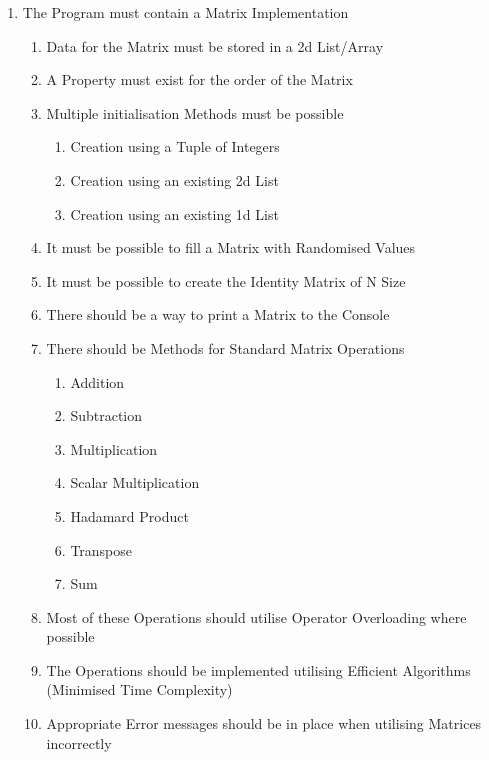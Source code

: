 \begin{flushleft}
\begin{enumerate}
                \item The Program must contain a Matrix Implementation
                \begin{enumerate}
                    \item Data for the Matrix must be stored in a 2d List/Array
                    \item A Property must exist for the order of the Matrix
                    \item Multiple initialisation Methods must be possible
                    \begin{enumerate}
                        \item Creation using a Tuple of Integers
                        \item Creation using an existing 2d List
                        \item Creation using an existing 1d List
                    \end{enumerate}
                    \item It must be possible to fill a Matrix with Randomised Values
                    \item It must be possible to create the Identity Matrix of N Size
                    \item There should be a way to print a Matrix to the Console
                    \item There should be Methods for Standard Matrix Operations
                    \begin{enumerate}
                        \item Addition 
                        \item Subtraction
                        \item Multiplication
                        \item Scalar Multiplication
                        \item Hadamard Product
                        \item Transpose
                        \item Sum
                    \end{enumerate}
                    \item Most of these Operations should utilise Operator Overloading where possible
                    \item The Operations should be implemented utilising Efficient Algorithms (Minimised Time Complexity)
                    \item Appropriate Error messages should be in place when utilising Matrices incorrectly
                \end{enumerate}


\end{enumerate}
\end{flushleft}
